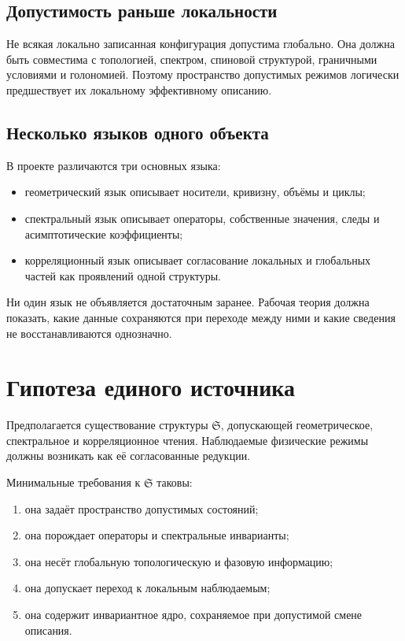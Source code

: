 \section{Допустимость раньше локальности}

Не всякая локально записанная конфигурация допустима глобально. Она должна
быть совместима с топологией, спектром, спиновой структурой, граничными
условиями и голономией. Поэтому пространство допустимых режимов логически
предшествует их локальному эффективному описанию.

\section{Несколько языков одного объекта}

В проекте различаются три основных языка:
\begin{itemize}
 \item геометрический язык описывает носители, кривизну, объёмы и циклы;
 \item спектральный язык описывает операторы, собственные значения, следы и
       асимптотические коэффициенты;
 \item корреляционный язык описывает согласование локальных и глобальных
       частей как проявлений одной структуры.
\end{itemize}

Ни один язык не объявляется достаточным заранее. Рабочая теория должна
показать, какие данные сохраняются при переходе между ними и какие сведения
не восстанавливаются однозначно.

\chapter{Гипотеза единого источника}

Предполагается существование структуры $\mathfrak S$, допускающей
геометрическое, спектральное и корреляционное чтения. Наблюдаемые физические
режимы должны возникать как её согласованные редукции.

Минимальные требования к $\mathfrak S$ таковы:
\begin{enumerate}
 \item она задаёт пространство допустимых состояний;
 \item она порождает операторы и спектральные инварианты;
 \item она несёт глобальную топологическую и фазовую информацию;
 \item она допускает переход к локальным наблюдаемым;
 \item она содержит инвариантное ядро, сохраняемое при допустимой смене
       описания.
\end{enumerate}

